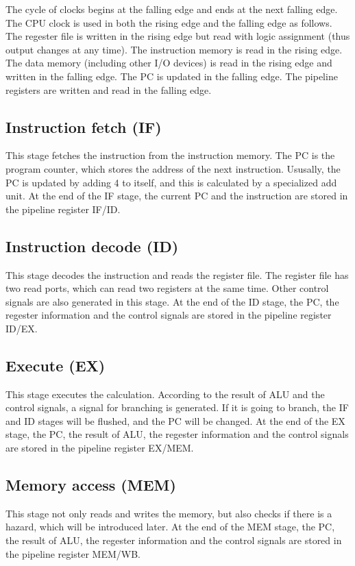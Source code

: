 \documentclass[
	a4paper, %
	11pt, %
]{CSUniSchoolLabReport}
\begin{document}
The cycle of clocks begins at the falling edge and ends at the next falling edge. The CPU clock is used in both the rising edge and the falling edge as follows. The regester file is written in the rising edge but read with logic assignment (thus output changes at any time). The instruction memory is read in the rising edge. The data memory (including other I/O devices) is read in the rising edge and written in the falling edge. The PC is updated in the falling edge. The pipeline registers are written and read in the falling edge.

\subsection*{Instruction fetch (IF)}
This stage fetches the instruction from the instruction memory. The PC is the program counter, which stores the address of the next instruction. Ususally, the PC is updated by adding 4 to itself, and this is calculated by a specialized add unit. At the end of the IF stage, the current PC and the instruction are stored in the pipeline register IF/ID.
\subsection*{Instruction decode (ID)}
This stage decodes the instruction and reads the register file. The register file has two read ports, which can read two registers at the same time. Other control signals are also generated in this stage. At the end of the ID stage, the PC, the regester information and the control signals are stored in the pipeline register ID/EX.

\subsection*{Execute (EX)}
This stage executes the calculation. According to the result of ALU and the control signals, a signal for branching is generated. If it is going to branch, the IF and ID stages will be flushed, and the PC will be changed. At the end of the EX stage, the PC, the result of ALU, the regester information and the control signals are stored in the pipeline register EX/MEM.

\subsection*{Memory access (MEM)}
This stage not only reads and writes the memory, but also checks if there is a hazard, which will be introduced later. At the end of the MEM stage, the PC, the result of ALU, the regester information and the control signals are stored in the pipeline register MEM/WB.
\end{document}
